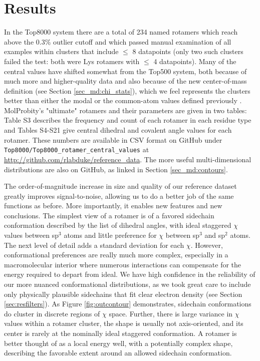 \section{Results}
In the Top8000 system there are a total of 234 named rotamers which reach above the 0.3\% outlier cutoff and \textcolor{changecolor}{which passed manual examination of all examples within clusters that include $\le$ 8 datapoints (only two such clusters failed the test: both were Lys rotamers with $\le$ 4 datapoints)}. Many of the central values have shifted somewhat from the Top500 system, both because of much more and higher-quality data and also because of the new center-of-mass definition (see Section \ref{sec_md:chi_stats}), which we feel represents the clusters better than either the modal or the common-atom values defined previously \cite{lovell2000penultimate}. MolProbity's "ultimate" rotamers and their parameters are given in two tables: Table S3 describes the frequency and count of each rotamer in each residue type and Tables S4-S21 give central dihedral and covalent angle values for each rotamer. These numbers are available in CSV format on GitHub under \texttt{Top8000/Top8000\_rotamer\_central\_values} at \url{http://github.com/rlabduke/reference_data}. The more useful multi-dimensional distributions are also on GitHub, as linked in Section \ref{sec_md:contours}.

The order-of-magnitude increase in size and quality of our reference dataset greatly improves signal-to-noise, allowing us to do a better job of the same functions as before. More importantly, it enables new features and new conclusions. The simplest view of a rotamer is of a favored sidechain conformation described by the list of dihedral angles, with ideal staggered $\chi$ values between sp$^{3}$ atoms and little preference for $\chi$ between sp$^{3}$ and sp$^{2}$ atoms. The next level of detail adds a standard deviation for each $\chi$. However, conformational preferences are really much more complex, especially in a macromolecular interior where numerous interactions can compensate for the energy required to depart from ideal. We have high confidence in the reliability of our more nuanced conformational distributions, as we took great care to include only physically plausible sidechains that fit clear electron density (see Section \ref{sec:resfilters}). As Figure \ref{fig:outcontour} demonstrates, sidechain conformations do cluster in discrete regions of $\chi$ space. Further, there is large variance in $\chi$ values within a rotamer cluster, the shape is usually not axis-oriented, and its center is rarely at the nominally ideal staggered conformation. A rotamer is better thought of as a local energy well, with a potentially complex shape, describing the favorable extent around an allowed sidechain conformation.

